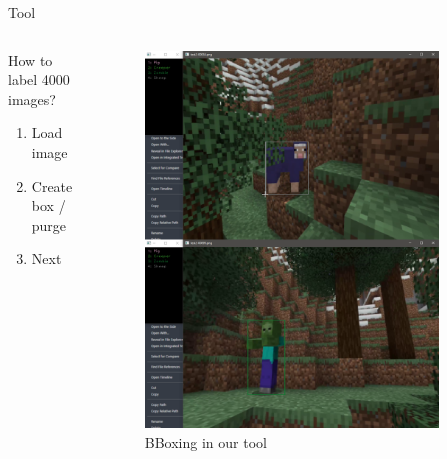 \documentclass[english]{beamer}
\begin{document}
\begin{frame}{Tool}
  \begin{columns}
    \begin{column}{0.5\textwidth}
      How to label 4000 images?
      \begin{enumerate}
        \item Load image
        \item Create box / purge
        \item Next
      \end{enumerate}
    \end{column}

    \begin{column}{0.5\textwidth}
      \begin{figure}[h]
        \centering
        \vspace*{-1cm}
        \includegraphics[width=0.9\textwidth]{../images/dataset_tool_show.png}
        \caption{BBoxing in our tool}
      \end{figure}
    \end{column}
  \end{columns}
\end{frame}
\end{document}
